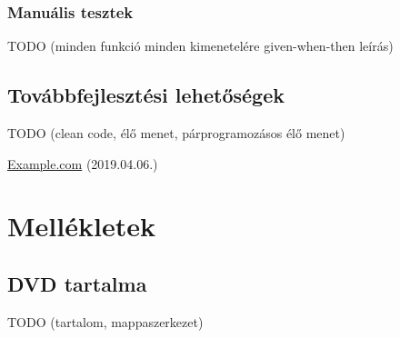 \documentclass{elteikthesis}
\begin{document}
			\subsection{Manuális tesztek}
			TODO (minden funkció minden kimenetelére given-when-then leírás)
		
		\section{Továbbfejlesztési lehetőségek}
		TODO (clean code, élő menet, párprogramozásos élő menet)

	\begin{thebibliography}{99}


		\href{http://example.com}{Example.com} (2019.04.06.)

	\end{thebibliography}
	
	\chapter*{Mellékletek}


	\section*{DVD tartalma}
	TODO (tartalom, mappaszerkezet)
\end{document}
